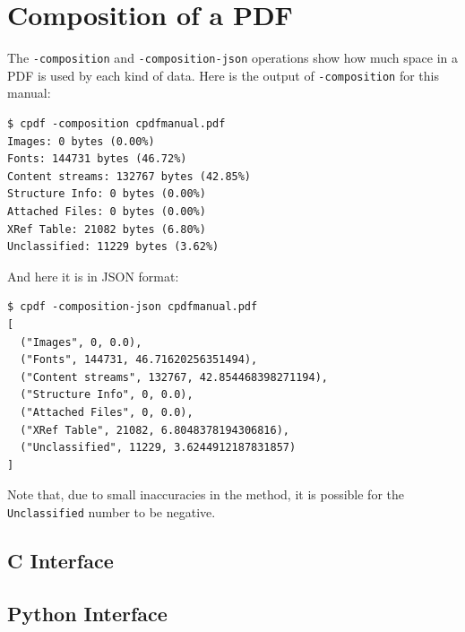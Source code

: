 \documentclass{book}
\begin{document}
\section{Composition of a PDF}

The \texttt{-composition} and \texttt{-composition-json} operations show how much space in a PDF is used by each kind of data. Here is the output of \texttt{-composition} for this manual:

\begin{framed}\small\begin{verbatim}$ cpdf -composition cpdfmanual.pdf
Images: 0 bytes (0.00%)
Fonts: 144731 bytes (46.72%)
Content streams: 132767 bytes (42.85%)
Structure Info: 0 bytes (0.00%)
Attached Files: 0 bytes (0.00%)
XRef Table: 21082 bytes (6.80%)
Unclassified: 11229 bytes (3.62%)
\end{verbatim}
\end{framed}\pagestyle{empty}\thispagestyle{fancy}

\noindent And here it is in JSON format:

\begin{framed}\small\begin{verbatim}$ cpdf -composition-json cpdfmanual.pdf
[
  ("Images", 0, 0.0),
  ("Fonts", 144731, 46.71620256351494),
  ("Content streams", 132767, 42.854468398271194),
  ("Structure Info", 0, 0.0),
  ("Attached Files", 0, 0.0),
  ("XRef Table", 21082, 6.8048378194306816),
  ("Unclassified", 11229, 3.6244912187831857)
]
\end{verbatim}
\end{framed}\pagestyle{empty}\thispagestyle{fancy}

\noindent Note that, due to small inaccuracies in the method, it is possible for the \texttt{Unclassified} number to be negative.

\begin{cpdflib}
\clearpage
\section*{C Interface}
\begin{small}\tt

\end{small}
\end{cpdflib}

\begin{pycpdflib}
\clearpage
\section*{Python Interface}
\begin{small}\tt

\end{small}
\end{pycpdflib}
\end{document}
